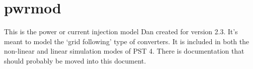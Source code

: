 \section{pwrmod}  
This is the power or current injection model Dan created for version 2.3.
It's meant to model the `grid following' type of converters.
It is included in both the non-linear and linear simulation modes of PST 4.
There is documentation that should probably be moved into this document.
